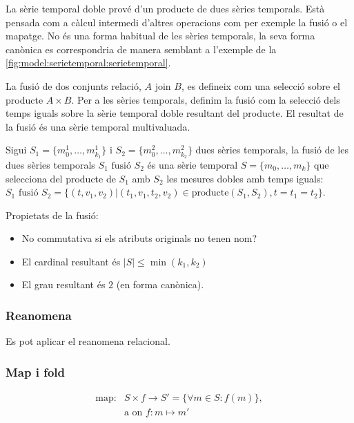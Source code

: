 La sèrie temporal doble prové d'un producte de dues sèries
temporals. Està pensada com a càlcul intermedi d'altres operacions com
per exemple la fusió o el mapatge.  No és una forma habitual de les
sèries temporals, la seva forma canònica es correspondria de manera
semblant a l'exemple de la
\autoref{fig:model:serietemporal:serietemporal}.




La fusió de dos conjunts relació, $A \text{ join } B$, es defineix com
una selecció sobre el producte $A \times B$. Per a les sèries
temporals, definim la fusió com la selecció dels temps iguals sobre la
sèrie temporal doble resultant del producte. El resultat de la fusió
és una sèrie temporal multivaluada.
\begin{definition}[fusió]
  Sigui $S_1=\{m_0^1, \dotsc, m_{k_1}^1\}$ i $S_2=\{m_0^2, \dotsc,
  m_{k_2}^2\}$ dues sèries temporals, la fusió de les dues sèries
  temporals $S_1 \text{ fusió } S_2$ és una sèrie temporal $S=\{m_0,
  \dotsc, m_k\}$ que selecciona del producte de $S_1$ amb $S_2$ les
  mesures dobles amb temps iguals: $S_1 \text{ fusió } S_2 = \{
  (t,v_1,v_2) | (t_1,v_1,t_2,v_2) \in \text{producte}(S_1,S_2),
  t=t_1=t_2 \}$.
\end{definition}


Propietats de la fusió:
\begin{itemize}
\item No commutativa si els atributs originals no tenen nom?
\item El cardinal resultant és $|S|\leq\min(k_1,k_2)$
\item El grau resultant és $2$ (en forma canònica).
\end{itemize}



\subsubsection{Reanomena}

Es pot aplicar el reanomena relacional. 






\subsubsection{Map i fold}

\begin{align*}
  \text{map}:& S \times f \longrightarrow S' = \{\forall m\in S : f(m) \}, \\
             & \text{a on } f: m \mapsto m' 
\end{align*}





